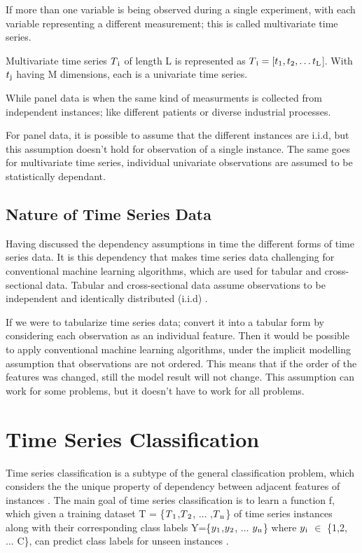 If more than one variable is being observed during a single experiment, with each variable representing a different measurement; this is called multivariate time series.
\begin{definition}
    Multivariate time series $T\textsubscript{i}$ of length L is represented as $T\textsubscript{i} = [t\textsubscript{1},t\textsubscript{2},\ldots t\textsubscript{L}$].
    With $t\textsubscript{j}$ having M dimensions, each is a univariate time series.
\end{definition}
While panel data is when the same kind of measurments is collected from independent instances; like different patients or diverse industrial processes.

For panel data, it is possible to assume that the different instances are i.i.d, but this assumption doesn't hold for observation of a single instance.
The same goes for multivariate time series, individual univariate observations are assumed to be statistically dependant.

\subsection{Nature of Time Series Data}
\label{NatureOfTimeSeriesData}
Having discussed the dependency assumptions in time the different forms of time series data.
It is this dependency that makes time series data challenging for conventional machine learning algorithms, which are used for tabular and cross-sectional data.
Tabular and cross-sectional data assume observations to be independent and identically distributed (i.i.d) \cite{loning2019sktime}.

If we were to tabularize time series data; convert it into a tabular form by considering each observation as an individual feature.
Then it would be possible to apply conventional machine learning algorithms, under the implicit modelling assumption that observations are not ordered.
This means that if the order of the features was changed, still the model result will not change.
This assumption can work for some problems, but it doesn't have to work for all problems.

\section{Time Series Classification}
\label{TimeSeriesClassification}
Time series classification is a subtype of the general classification problem, which considers the the unique property of dependency between adjacent features of instances \cite{Bostrom2017}.
The main goal of time series classification is to learn a function f,
which given a training dataset T = \{$T\textsubscript{1}$,$T\textsubscript{2}$, $\ldots$ ,$T\textsubscript{n}$\} of time series instances
along with their corresponding class labels Y=\{$y\textsubscript{1}$,$y\textsubscript{2}$, $\ldots$ $y\textsubscript{n}$\} where $y\textsubscript{i}$ $\in$ \{1,2, $\ldots$ C\},
can predict class labels for unseen instances \cite{deng2013time}.

